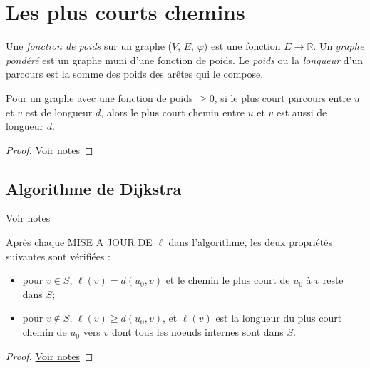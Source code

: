 \section{Les plus courts chemins}
\begin{mydef}
  Une \emph{fonction de poids} sur un graphe ($V$, $E$, $\varphi$) est une fonction $E \to \mathbb{R}$. Un \emph{graphe pondéré} est un graphe muni d’une fonction de poids. Le \emph{poids} ou la \emph{longueur} d’un parcours est la somme des poids des arêtes qui le compose.
\end{mydef}

\begin{mytheo} 
  Pour un graphe avec une fonction de poids $\geq 0$, si le plus court parcours entre $u$ et $v$ est de longueur $d$, alors le plus court chemin entre $u$ et $v$ est aussi de longueur $d$.
  \begin{proof}
     \href{https://dl.dropboxusercontent.com/u/44092863/Graph_Theory_Romain_Capron.pdf}{Voir notes}
  \end{proof}
\end{mytheo}

\subsection{Algorithme de Dijkstra}
\begin{myalgo}
\end{myalgo}

\begin{myexem}
  \href{https://dl.dropboxusercontent.com/u/44092863/Graph_Theory_Romain_Capron.pdf}{Voir notes}
\end{myexem}

\begin{mytheo} 
  Après chaque MISE A JOUR DE $\ell$ dans l’algorithme, les deux propriétés suivantes sont vérifiées :
  \begin{itemize}
    \item pour $v \in S$, $\ell(v) = d(u_0, v)$ et le chemin le plus court de $u_0$ à $v$ reste dans $S$;
    \item pour $v \notin S$, $\ell(v) \geq d(u_0, v)$, et $\ell(v)$ est la longueur du plus court chemin de $u_0$ vers $v$ dont tous les noeuds internes sont dans $S$.
  \end{itemize}
  \begin{proof}
     \href{https://dl.dropboxusercontent.com/u/44092863/Graph_Theory_Romain_Capron.pdf}{Voir notes}
  \end{proof}
\end{mytheo}


